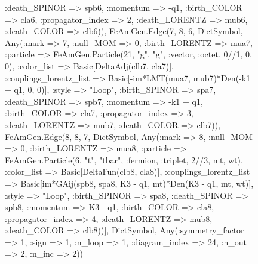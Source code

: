 \documentclass{revtex4}
\begin{document}
\begin{figure}[!htb]
\begin{center}
{:death_SPINOR => spb6, :momentum => -q1, :birth_COLOR => cla6, :propagator_index => 2, :death_LORENTZ => mub6, :death_COLOR => clb6)), FeAmGen.Edge(7, 8, 6, Dict{Symbol, Any}(:mark => 7, :null_MOM => 0, :birth_LORENTZ => mua7, :particle => FeAmGen.Particle(21, "g", "g", :vector, :octet, 0//1, 0, 0), :color_list => Basic[DeltaAdj(clb7, cla7)], :couplings_lorentz_list => Basic[-im*LMT(mua7, mub7)*Den(-k1 + q1, 0, 0)], :style => "Loop", :birth_SPINOR => spa7, :death_SPINOR => spb7, :momentum => -k1 + q1, :birth_COLOR => cla7, :propagator_index => 3, :death_LORENTZ => mub7, :death_COLOR => clb7)), FeAmGen.Edge(8, 8, 7, Dict{Symbol, Any}(:mark => 8, :null_MOM => 0, :birth_LORENTZ => mua8, :particle => FeAmGen.Particle(6, "t", "tbar", :fermion, :triplet, 2//3, mt, wt), :color_list => Basic[DeltaFun(clb8, cla8)], :couplings_lorentz_list => Basic[im*GAij(spb8, spa8, K3 - q1, mt)*Den(K3 - q1, mt, wt)], :style => "Loop", :birth_SPINOR => spa8, :death_SPINOR => spb8, :momentum => K3 - q1, :birth_COLOR => cla8, :propagator_index => 4, :death_LORENTZ => mub8, :death_COLOR => clb8))], Dict{Symbol, Any}(:symmetry_factor => 1, :sign => 1, :n_loop => 1, :diagram_index => 24, :n_out => 2, :n_inc => 2)) 
}
\end{center}
\end{figure}
\end{document}
